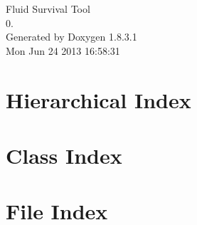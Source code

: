 \documentclass{book}
\begin{document}
\hypersetup{pageanchor=false,citecolor=blue}
\begin{titlepage}
\vspace*{7cm}
\begin{center}
{\Large Fluid Survival Tool \\[1ex]\large 0. }\\
\vspace*{1cm}
{\large Generated by Doxygen 1.8.3.1}\\
\vspace*{0.5cm}
{\small Mon Jun 24 2013 16:58:31}\\
\end{center}
\end{titlepage}
\clearemptydoublepage
{}
\tableofcontents
\clearemptydoublepage
{}
\hypersetup{pageanchor=true,citecolor=blue}
\chapter{Hierarchical Index}

\chapter{Class Index}

\chapter{File Index}

\end{document}
